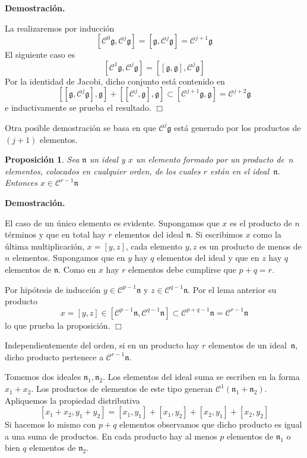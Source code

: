 \documentclass[a4paper,draft,12pt]{article}
\newtheorem{propo}[teo]{Proposición}%
\newcommand{\dem}{\noindent \textbf{Demostración. }\vspace{0.3 cm}}%
\newcommand{\fin}{ $\Box $ \vspace{0.4 cm}}
\newcommand{\central}{\mathcal{C}}%
\begin{document}
\dem

La realizaremos por inducción
$$
[\central^0\mathfrak{g}, \central^j\mathfrak{g}] = [\mathfrak{g}, \central^j \mathfrak{g}]= \central^{j+1}\mathfrak{g}
$$
El siguiente caso es
$$[\central^1\mathfrak{g}, \central^j\mathfrak{g}]= [[\mathfrak{g},\mathfrak{g}], \central^j\mathfrak{g}]
$$
Por la identidad de Jacobi, dicho conjunto está contenido en 
$$
[[\mathfrak{g},\central^j\mathfrak{g}],\mathfrak{g}]+[[\central^j, \mathfrak{g}], \mathfrak{g}] \subset [\central^{j+1}\mathfrak{g},\mathfrak{g}]= \central^{j+2}\mathfrak{g}
$$
e inductivamente se prueba el resultado. \fin


Otra posible demostración se basa en que $\central^j\mathfrak{g}$ está generado por los productos de $(j+1)$ elementos.

\bigskip

\begin{propo}

Sea $\mathfrak{n}$ un ideal y $x$ un elemento formado por un producto de~$n$ elementos, colocados en cualquier orden, de los cuales $r$ están en el ideal~$\mathfrak{n}$.  Entonces $x \in \central^{r-1} \mathfrak{n}$

\end{propo}

\dem

El caso de un único elemento es evidente.  Supongamos que $x$ es el producto de $n$ términos y que en total hay $r$ elementos del ideal $\mathfrak{n}$. Si escribimos $x$ como la última multiplicación, $x=[y,z]$, cada elemento $y,z$ es un producto de  menos de $n$ elementos.  Supongamos que en $y$ hay $q$ elementos del ideal y que en $z$ hay $q$ elementos de $\mathfrak{n}$. Como en $x$ hay $r$ elementos debe cumplirse que $p+q=r$.

Por hipótesis de inducción $y \in \central^{p-1}\mathfrak{n}$ y $z \in \central^{q-1}\mathfrak{n}$. Por el lema anterior su producto
$$
x=[y,z]\in [\central^{p-1}\mathfrak{n}, \central^{q-1}\mathfrak{n}]\subset \central^{p+q-1}\mathfrak{n}= \central^{r-1}\mathfrak{n}
$$
lo que prueba la proposición. \fin

Independientemente del orden, si en un producto hay $r$ elementos de un ideal~$\mathfrak{n}$, dicho producto pertenece a $\central^{r-1}\mathfrak{n}$.

\bigskip



Tomemos dos ideales $\mathfrak{n}_1, \mathfrak{n}_2$. Los elementos del ideal suma se escriben en la forma $x_1+x_2$.  Los productos de elementos de este tipo generan $\central^1(\mathfrak{n}_1+\mathfrak{n}_2)$.  Apliquemos la propiedad distributiva
$$
[x_1+x_2, y_1+y_2]= [x_1,y_1]+[x_1,y_2]+ [x_2,y_1]+[x_2,y_2]
$$
Si hacemos lo mismo con $p+q$ elementos observamos que dicho producto es igual a una suma de productos.  En cada producto hay al menos $p$ elementos de $\mathfrak{n}_1$ o bien $q$ elementos de $\mathfrak{n}_2$.
\end{document}
